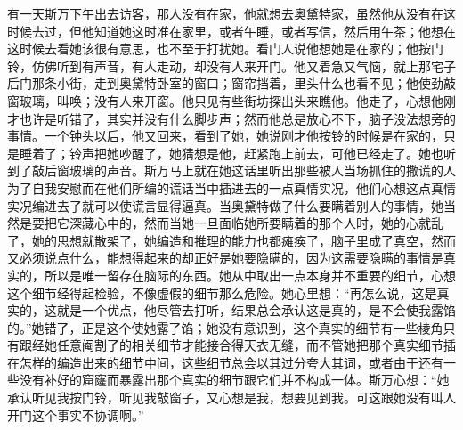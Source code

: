 \par 有一天斯万下午出去访客，那人没有在家，他就想去奥黛特家，虽然他从没有在这时候去过，但他知道她这时准在家里，或者午睡，或者写信，然后用午茶；他想在这时候去看她该很有意思，也不至于打扰她。看门人说他想她是在家的；他按门铃，仿佛听到有声音，有人走动，却没有人来开门。他又着急又气恼，就上那宅子后门那条小街，走到奥黛特卧室的窗口；窗帘挡着，里头什么也看不见；他使劲敲窗玻璃，叫唤；没有人来开窗。他只见有些街坊探出头来瞧他。他走了，心想他刚才也许是听错了，其实并没有什么脚步声；然而他总是放心不下，脑子没法想旁的事情。一个钟头以后，他又回来，看到了她，她说刚才他按铃的时候是在家的，只是睡着了；铃声把她吵醒了，她猜想是他，赶紧跑上前去，可他已经走了。她也听到了敲后窗玻璃的声音。斯万马上就在她这话里听出那些被人当场抓住的撒谎的人为了自我安慰而在他们所编的谎话当中插进去的一点真情实况，他们心想这点真情实况编进去了就可以使谎言显得逼真。当奥黛特做了什么要瞒着别人的事情，她当然是要把它深藏心中的，然而当她一旦面临她所要瞒着的那个人时，她的心就乱了，她的思想就散架了，她编造和推理的能力也都瘫痪了，脑子里成了真空，然而又必须说点什么，能想得起来的却正好是她要隐瞒的，因为这需要隐瞒的事情是真实的，所以是唯一留存在脑际的东西。她从中取出一点本身并不重要的细节，心想这个细节经得起检验，不像虚假的细节那么危险。她心里想：“再怎么说，这是真实的，这就是一个优点，他尽管去打听，结果总会承认这是真的，是不会使我露馅的。”她错了，正是这个使她露了馅；她没有意识到，这个真实的细节有一些棱角只有跟经她任意阉割了的相关细节才能接合得天衣无缝，而不管她把那个真实细节插在怎样的编造出来的细节中间，这些细节总会以其过分夸大其词，或者由于还有一些没有补好的窟窿而暴露出那个真实的细节跟它们并不构成一体。斯万心想：“她承认听见我按门铃，听见我敲窗子，又心想是我，想要见到我。可这跟她没有叫人开门这个事实不协调啊。”
